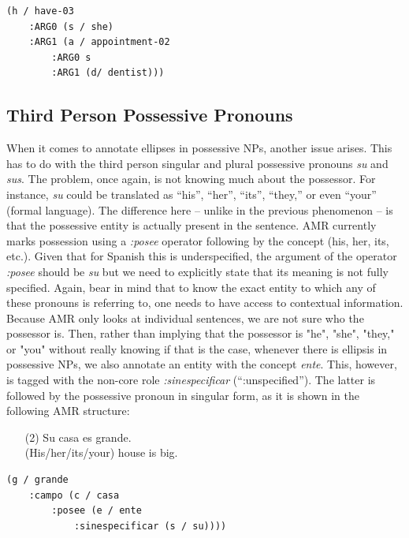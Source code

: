 \documentclass[10pt, a4paper]{article}
\begin{document}
\begin{verbatim}
(h / have-03
    :ARG0 (s / she)
    :ARG1 (a / appointment-02
        :ARG0 s
        :ARG1 (d/ dentist)))
\end{verbatim}

\subsection{Third Person Possessive Pronouns}\label{sec:third-pers-poss}

When it comes to annotate ellipses in possessive NPs, another issue arises. This has to do with the third person singular and plural possessive pronouns \emph{su} and \emph{sus}. The problem, once again, is not knowing much about the possessor. For instance, \emph{su} could be translated as ``his'', ``her'', ``its'', ``they,'' or even ``your'' (formal language). The difference here -- unlike in the previous phenomenon -- is that the possessive entity is actually present in the sentence. AMR currently marks possession using a \emph{:posee} operator following by the concept (his, her, its, etc.). Given that for Spanish this is underspecified, the argument of the operator \emph{:posee} should be \emph{su} but we need to explicitly state that its meaning is not fully specified. Again, bear in mind that to know the exact entity to which any of these pronouns is referring to, one needs to have access to contextual information. Because AMR only looks at individual sentences, we are not sure who the possessor is. Then, rather than implying that the possessor is "he", "she", "they," or "you" without really knowing if that is the case, whenever there is ellipsis in possessive NPs, we also annotate an entity with the concept \emph{ente}. This, however, is tagged with the non-core role \emph{:sinespecificar} (``:unspecified''). The latter is followed by the possessive pronoun in singular form, as it is shown in the following AMR structure:

\begin{enumerate}
\item[(2)]Su casa es grande.\\
(His/her/its/your) house is big.
\end{enumerate}

\begin{verbatim}
(g / grande
    :campo (c / casa
        :posee (e / ente
            :sinespecificar (s / su))))
\end{verbatim}
\end{document}
